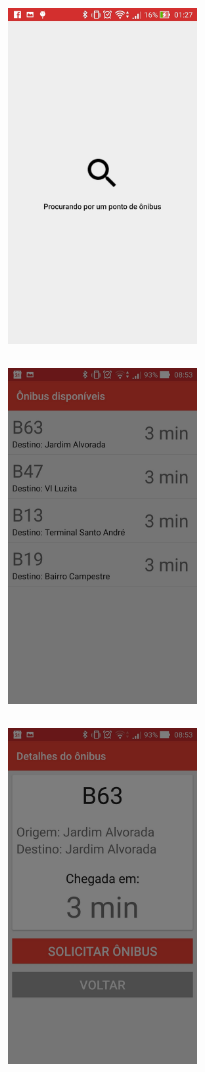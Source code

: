 \documentclass[a4paper, 12pt]{article}
\begin{document}
\includegraphics[width=5cm, center]{images/beacon_searching_bus_stop}
\\
\\
\includegraphics[width=5cm, center]{images/beacon_list_bus}
\\
\\
\includegraphics[width=5cm, center]{images/beacon_detail_bus}
\end{document}
